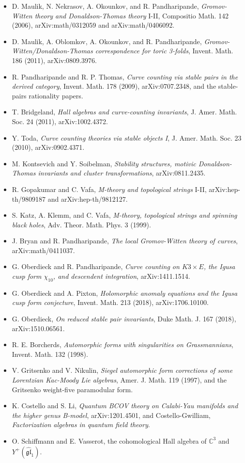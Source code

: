 \documentclass[11pt]{article}
\theoremstyle{definition}
\providecommand{\C}{\mathbb{C}}
\begin{document}
\begin{itemize}[leftmargin=1.1em]
\item D. Maulik, N. Nekrasov, A. Okounkov, and R. Pandharipande,
\emph{Gromov-Witten theory and Donaldson-Thomas theory} I-II,
Compositio Math. 142 (2006), arXiv:math/0312059 and arXiv:math/0406092.
\item D. Maulik, A. Oblomkov, A. Okounkov, and R. Pandharipande,
\emph{Gromov-Witten/Donaldson-Thomas correspondence for toric
3-folds}, Invent. Math. 186 (2011), arXiv:0809.3976.
\item R. Pandharipande and R. P. Thomas, \emph{Curve counting via stable
pairs in the derived category}, Invent. Math. 178 (2009),
arXiv:0707.2348, and the stable-pairs rationality papers.
\item T. Bridgeland, \emph{Hall algebras and curve-counting invariants},
J. Amer. Math. Soc. 24 (2011), arXiv:1002.4372.
\item Y. Toda, \emph{Curve counting theories via stable objects I},
J. Amer. Math. Soc. 23 (2010), arXiv:0902.4371.
\item M. Kontsevich and Y. Soibelman, \emph{Stability structures,
motivic Donaldson-Thomas invariants and cluster transformations},
arXiv:0811.2435.
\item R. Gopakumar and C. Vafa, \emph{M-theory and topological strings}
I-II, arXiv:hep-th/9809187 and arXiv:hep-th/9812127.
\item S. Katz, A. Klemm, and C. Vafa, \emph{M-theory, topological
strings and spinning black holes}, Adv. Theor. Math. Phys. 3 (1999).
\item J. Bryan and R. Pandharipande, \emph{The local Gromov-Witten
theory of curves}, arXiv:math/0411037.
\item G. Oberdieck and R. Pandharipande, \emph{Curve counting on
\(K3\times E\), the Igusa cusp form \(\chi_{10}\), and descendent
integration}, arXiv:1411.1514.
\item G. Oberdieck and A. Pixton, \emph{Holomorphic anomaly equations and
the Igusa cusp form conjecture}, Invent. Math. 213 (2018),
arXiv:1706.10100.
\item G. Oberdieck, \emph{On reduced stable pair invariants},
Duke Math. J. 167 (2018), arXiv:1510.06561.
\item R. E. Borcherds, \emph{Automorphic forms with singularities on
Grassmannians}, Invent. Math. 132 (1998).
\item V. Gritsenko and V. Nikulin, \emph{Siegel automorphic form
corrections of some Lorentzian Kac-Moody Lie algebras}, Amer. J. Math.
119 (1997), and the Gritsenko weight-five paramodular form.
\item K. Costello and S. Li, \emph{Quantum BCOV theory on Calabi-Yau
manifolds and the higher genus B-model}, arXiv:1201.4501, and
Costello-Gwilliam, \emph{Factorization algebras in quantum field theory}.
\item O. Schiffmann and E. Vasserot, the cohomological Hall algebra of
\(\C^3\) and \(Y^+(\widehat{\mathfrak{gl}}_1)\).
\end{itemize}
\end{document}
